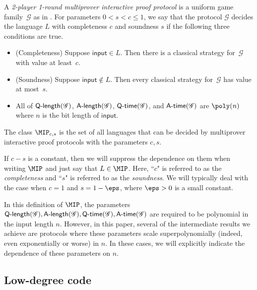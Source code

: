 \documentclass[11pt]{article}
\newcommand{\game}{\mathscr{G}}
\newcommand{\qtime}[1]{\mathsf{Q}\textnormal{-}\mathsf{time}(#1)}
\newcommand{\atime}[1]{\mathsf{A}\textnormal{-}\mathsf{time}(#1)}
\newcommand{\qlength}[1]{\mathsf{Q}\textnormal{-}\mathsf{length}(#1)}
\newcommand{\alength}[1]{\mathsf{A}\textnormal{-}\mathsf{length}(#1)}
\begin{document}
\begin{definition}\label{def:mip-protocols}
A \emph{2-player 1-round multiprover interactive proof protocol} is a uniform
game family~$\game$ as in . For
parameters $0 < s < c \leq 1$, we say that
the protocol $\game$ decides the language $L$ with completeness
$c$ and soundness $s$ if the following three conditions are true.
\begin{itemize}
\item[$\circ$] (Completeness) Suppose $\mathsf{input} \in L$.  Then there is a classical strategy for~$\game$ with value at least~$c$.
\item[$\circ$] (Soundness) Suppose $\mathsf{input} \notin L$.  Then every classical strategy for~$\game$ has value at most~$s$.
\item[$\circ$] All of $\qlength{\game}$, $\alength{\game}$,
  $\qtime{\game}$, and $\atime{\game}$ are $\poly(n)$ where $n$ is
  the bit length of $\mathsf{input}$.
\end{itemize}
The class $\MIP_{c, s}$ is the set of all languages that can be
decided by multiprover interactive proof protocols with the parameters $c,s$.

If $c - s$ is a constant, then we will suppress the dependence on them when writing $\MIP$ and just say that $L \in \MIP$.
Here, ``$c$" is referred to as the \emph{completeness} and ``$s$" is referred to as the \emph{soundness}.
We will typically deal with the case when $c = 1$ and $s = 1-\eps$, where $\eps > 0$ is a small constant.

\end{definition}
In this definition of $\MIP$, the parameters $\qlength{\game}, \alength{\game},
\qtime{\game}, \atime{\game}$ are required to be polynomial in the
input length $n$. However, in this paper, several of the intermediate
results we achieve are protocols where these parameters scale
superpolynomially (indeed, even exponentially or worse) in $n$. In
these cases, we will explicitly indicate the dependence of these
parameters on $n$.


\subsection{Low-degree code}
\end{document}
